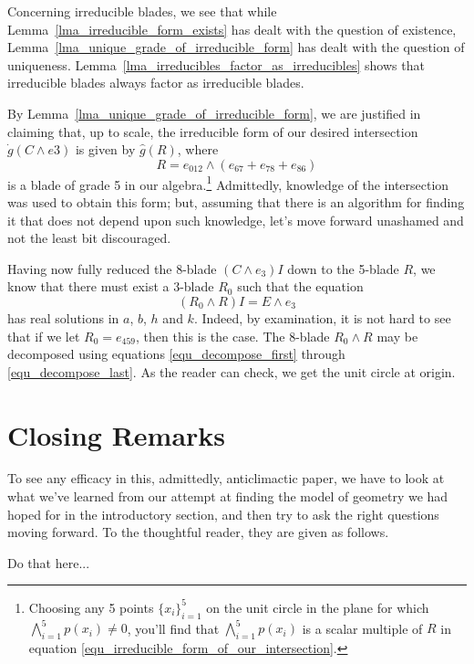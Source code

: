 \documentclass{birkjour}
\theoremstyle{definition}
\theoremstyle{remark}
\numberwithin{equation}{section}
\newcommand{\gd}{\dot{g}}
\newcommand{\gh}{\hat{g}}
\begin{document}
Concerning irreducible blades, we see that while Lemma~\ref{lma_irreducible_form_exists} has dealt with
the question of existence, Lemma~\ref{lma_unique_grade_of_irreducible_form} has dealt with the question of uniqueness.
Lemma~\ref{lma_irreducibles_factor_as_irreducibles} shows that irreducible blades always factor
as irreducible blades.

By Lemma~\ref{lma_unique_grade_of_irreducible_form}, we are justified in
claiming that, up to scale, the irreducible form of
our desired intersection $\gd(C\wedge e3)$ is given by $\gh(R)$, where
\begin{equation}\label{equ_irreducible_form_of_our_intersection}
R = e_{012}\wedge(e_{67} + e_{78} + e_{86})
\end{equation}
is a blade of grade 5 in our algebra.\footnote{Choosing any 5 points $\{x_i\}_{i=1}^5$ on
the unit circle in the plane for which $\bigwedge_{i=1}^5 p(x_i)\neq 0$, you'll find that $\bigwedge_{i=1}^5 p(x_i)$
is a scalar multiple of $R$ in equation \eqref{equ_irreducible_form_of_our_intersection}.}
Admittedly, knowledge of the intersection was used
to obtain this form; but, assuming that there is an algorithm for finding it
that does not depend upon such knowledge, let's move forward unashamed
and not the least bit discouraged.

Having now fully reduced the 8-blade $(C\wedge e_3)I$ down to the 5-blade $R$, we know
that there must exist a 3-blade $R_0$ such that the equation
\begin{equation*}
(R_0\wedge R)I = E\wedge e_3
\end{equation*}
has real solutions in $a$, $b$, $h$ and $k$.
Indeed, by examination, it is not hard to see that if we let $R_0=e_{459}$, then this is the case.
The 8-blade $R_0\wedge R$ may be decomposed using equations \eqref{equ_decompose_first} through \eqref{equ_decompose_last}.
As the reader can check, we get the unit circle at origin.

\section{Closing Remarks}

To see any efficacy in this, admittedly, anticlimactic paper, we have to look at what
we've learned from our attempt at finding the model of geometry we had hoped
for in the introductory section, and then try to ask the right questions moving forward.
To the thoughtful reader, they are given as follows.

Do that here...
\end{document}
